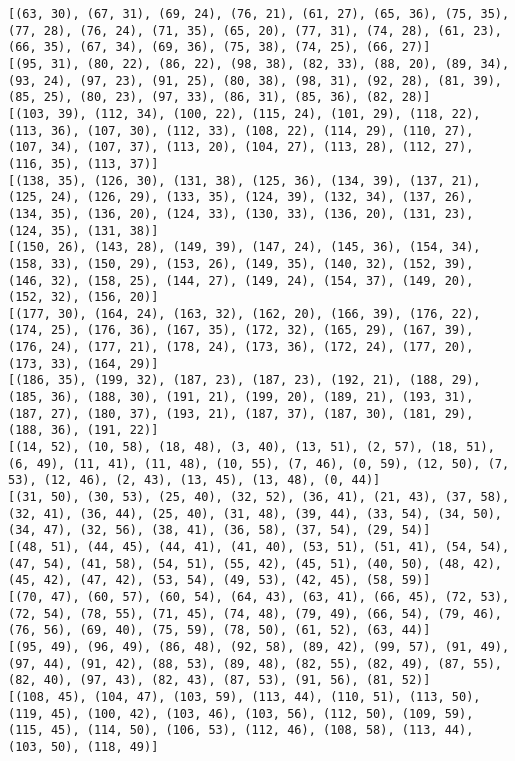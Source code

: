 \documentclass[11pt]{article}
\begin{document}
\begin{Verbatim}[commandchars=\\\{\}]
[(63, 30), (67, 31), (69, 24), (76, 21), (61, 27), (65, 36), (75, 35), (77, 28), (76, 24), (71, 35), (65, 20), (77, 31), (74, 28), (61, 23), (66, 35), (67, 34), (69, 36), (75, 38), (74, 25), (66, 27)]
[(95, 31), (80, 22), (86, 22), (98, 38), (82, 33), (88, 20), (89, 34), (93, 24), (97, 23), (91, 25), (80, 38), (98, 31), (92, 28), (81, 39), (85, 25), (80, 23), (97, 33), (86, 31), (85, 36), (82, 28)]
[(103, 39), (112, 34), (100, 22), (115, 24), (101, 29), (118, 22), (113, 36), (107, 30), (112, 33), (108, 22), (114, 29), (110, 27), (107, 34), (107, 37), (113, 20), (104, 27), (113, 28), (112, 27), (116, 35), (113, 37)]
[(138, 35), (126, 30), (131, 38), (125, 36), (134, 39), (137, 21), (125, 24), (126, 29), (133, 35), (124, 39), (132, 34), (137, 26), (134, 35), (136, 20), (124, 33), (130, 33), (136, 20), (131, 23), (124, 35), (131, 38)]
[(150, 26), (143, 28), (149, 39), (147, 24), (145, 36), (154, 34), (158, 33), (150, 29), (153, 26), (149, 35), (140, 32), (152, 39), (146, 32), (158, 25), (144, 27), (149, 24), (154, 37), (149, 20), (152, 32), (156, 20)]
[(177, 30), (164, 24), (163, 32), (162, 20), (166, 39), (176, 22), (174, 25), (176, 36), (167, 35), (172, 32), (165, 29), (167, 39), (176, 24), (177, 21), (178, 24), (173, 36), (172, 24), (177, 20), (173, 33), (164, 29)]
[(186, 35), (199, 32), (187, 23), (187, 23), (192, 21), (188, 29), (185, 36), (188, 30), (191, 21), (199, 20), (189, 21), (193, 31), (187, 27), (180, 37), (193, 21), (187, 37), (187, 30), (181, 29), (188, 36), (191, 22)]
[(14, 52), (10, 58), (18, 48), (3, 40), (13, 51), (2, 57), (18, 51), (6, 49), (11, 41), (11, 48), (10, 55), (7, 46), (0, 59), (12, 50), (7, 53), (12, 46), (2, 43), (13, 45), (13, 48), (0, 44)]
[(31, 50), (30, 53), (25, 40), (32, 52), (36, 41), (21, 43), (37, 58), (32, 41), (36, 44), (25, 40), (31, 48), (39, 44), (33, 54), (34, 50), (34, 47), (32, 56), (38, 41), (36, 58), (37, 54), (29, 54)]
[(48, 51), (44, 45), (44, 41), (41, 40), (53, 51), (51, 41), (54, 54), (47, 54), (41, 58), (54, 51), (55, 42), (45, 51), (40, 50), (48, 42), (45, 42), (47, 42), (53, 54), (49, 53), (42, 45), (58, 59)]
[(70, 47), (60, 57), (60, 54), (64, 43), (63, 41), (66, 45), (72, 53), (72, 54), (78, 55), (71, 45), (74, 48), (79, 49), (66, 54), (79, 46), (76, 56), (69, 40), (75, 59), (78, 50), (61, 52), (63, 44)]
[(95, 49), (96, 49), (86, 48), (92, 58), (89, 42), (99, 57), (91, 49), (97, 44), (91, 42), (88, 53), (89, 48), (82, 55), (82, 49), (87, 55), (82, 40), (97, 43), (82, 43), (87, 53), (91, 56), (81, 52)]
[(108, 45), (104, 47), (103, 59), (113, 44), (110, 51), (113, 50), (119, 45), (100, 42), (103, 46), (103, 56), (112, 50), (109, 59), (115, 45), (114, 50), (106, 53), (112, 46), (108, 58), (113, 44), (103, 50), (118, 49)]

\end{Verbatim}
\end{document}
